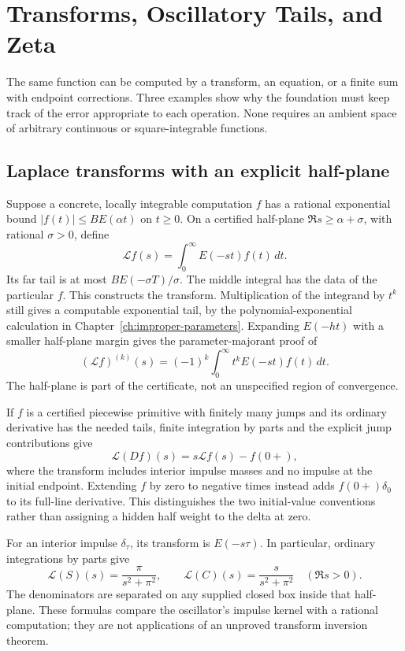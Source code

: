 \chapter{Transforms, Oscillatory Tails, and Zeta}
\label{ch:transforms-zeta}

The same function can be computed by a transform, an equation, or a finite
sum with endpoint corrections.  Three examples show why the foundation
must keep track of the error appropriate to each operation.  None requires
an ambient space of arbitrary continuous or square-integrable functions.

\section{Laplace transforms with an explicit half-plane}
Suppose a concrete, locally integrable computation $f$ has a rational
exponential bound $|f(t)|\le B E(\alpha t)$ on $t\ge0$.  On a certified
half-plane $\Re s\ge\alpha+\sigma$, with rational $\sigma>0$, define
\[
 \mathcal Lf(s)=\int_0^\infty E(-st)f(t)\,dt.
\]
Its far tail is at most $B E(-\sigma T)/\sigma$.  The middle integral
has the data of the particular $f$.  This constructs the transform.
Multiplication of the integrand by $t^k$ still gives a computable
exponential tail, by the polynomial-exponential calculation in
Chapter~\ref{ch:improper-parameters}.  Expanding $E(-ht)$ with a smaller
half-plane margin gives the parameter-majorant proof of
\[
 (\mathcal Lf)^{(k)}(s)=(-1)^k\int_0^\infty t^kE(-st)f(t)\,dt.
\]
The half-plane is part of the certificate, not an unspecified region of
convergence.

If $f$ is a certified piecewise primitive with finitely many jumps and
its ordinary derivative has the needed tails, finite integration by parts
and the explicit jump contributions give
\[
 \mathcal L(Df)(s)=s\mathcal Lf(s)-f(0+),
\]
where the transform includes interior impulse masses and no impulse at
the initial endpoint.  Extending $f$ by zero to negative times instead
adds $f(0+)\delta_0$ to its full-line derivative.  This distinguishes
the two initial-value conventions rather than assigning a hidden half
weight to the delta at zero.

For an interior impulse $\delta_\tau$, its transform is $E(-s\tau)$.
In particular, ordinary integrations by parts give
\[
 \mathcal L(S)(s)=\frac\pi{s^2+\pi^2},\qquad
 \mathcal L(C)(s)=\frac{s}{s^2+\pi^2}\quad(\Re s>0).
\]
The denominators are separated on any supplied closed box inside that
half-plane.  These formulas compare the oscillator's impulse kernel with
a rational computation; they are not applications of an unproved transform
inversion theorem.

